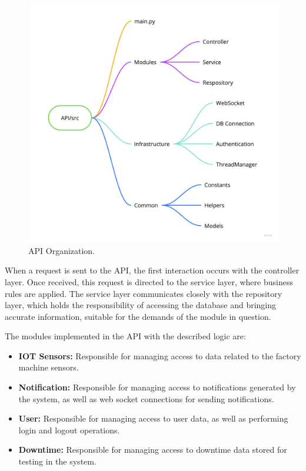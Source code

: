 \begin{figure}[htbp]
	\centering
	\includegraphics[scale=0.1]{images/API_Organization.jpg}
	\caption{API Organization.}
	\label{fig:api_organization}
\end{figure}

When a request is sent to the \gls{API}, the first interaction occurs with the controller layer. Once received, this request is directed to the service layer, where business rules are applied. The service layer communicates closely with the repository layer, which holds the responsibility of accessing the database and bringing accurate information, suitable for the demands of the module in question.

The modules implemented in the \gls{API} with the described logic are:
\begin{itemize}
	\item \textbf{IOT Sensors:} Responsible for managing access to data related to the factory machine sensors.
	\item \textbf{Notification:} Responsible for managing access to notifications generated by the system, as well as web socket connections for sending notifications.
	\item \textbf{User:} Responsible for managing access to user data, as well as performing login and logout operations. 
	\item \textbf{Downtime:} Responsible for managing access to downtime data stored for testing in the system.
\end{itemize}

